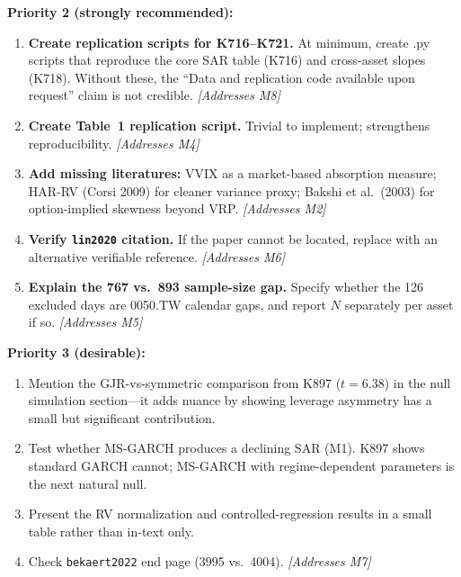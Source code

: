 \documentclass[12pt,a4paper]{article}
\begin{document}
\textbf{Priority 2 (strongly recommended):}
\begin{enumerate}[resume]
\item \textbf{Create replication scripts for K716--K721.} At minimum, create .py scripts that reproduce the core SAR table (K716) and cross-asset slopes (K718). Without these, the ``Data and replication code available upon request'' claim is not credible. \textit{[Addresses M8]}

\item \textbf{Create Table~1 replication script.} Trivial to implement; strengthens reproducibility. \textit{[Addresses M4]}

\item \textbf{Add missing literatures:} VVIX as a market-based absorption measure; HAR-RV (Corsi 2009) for cleaner variance proxy; Bakshi et al.\ (2003) for option-implied skewness beyond VRP. \textit{[Addresses M2]}

\item \textbf{Verify \texttt{lin2020} citation.} If the paper cannot be located, replace with an alternative verifiable reference. \textit{[Addresses M6]}

\item \textbf{Explain the 767 vs.\ 893 sample-size gap.} Specify whether the 126 excluded days are 0050.TW calendar gaps, and report $N$ separately per asset if so. \textit{[Addresses M5]}
\end{enumerate}

\textbf{Priority 3 (desirable):}
\begin{enumerate}[resume]
\item Mention the GJR-vs-symmetric comparison from K897 ($t = 6.38$) in the null simulation section---it adds nuance by showing leverage asymmetry has a small but significant contribution.

\item Test whether MS-GARCH produces a declining SAR (M1). K897 shows standard GARCH cannot; MS-GARCH with regime-dependent parameters is the next natural null.

\item Present the RV normalization and controlled-regression results in a small table rather than in-text only.

\item Check \texttt{bekaert2022} end page (3995 vs.\ 4004). \textit{[Addresses M7]}
\end{enumerate}


\bigskip
\end{document}
